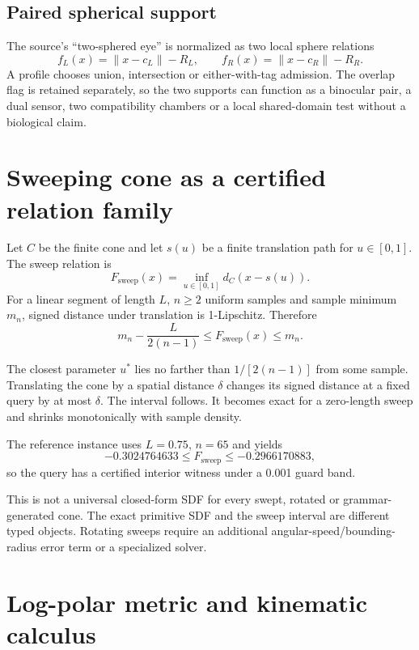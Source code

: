 \documentclass[10pt,a4paper]{article}
\begin{document}
\subsection{Paired spherical support}
The source's ``two-sphered eye'' is normalized as two local sphere relations
\[
f_L(x)=\|x-c_L\|-R_L,\qquad f_R(x)=\|x-c_R\|-R_R.
\]
A profile chooses union, intersection or either-with-tag admission. The overlap flag is retained separately, so the two supports can function as a binocular pair, a dual sensor, two compatibility chambers or a local shared-domain test without a biological claim.

\section{Sweeping cone as a certified relation family}

Let $C$ be the finite cone and let $s(u)$ be a finite translation path for $u\in[0,1]$. The sweep relation is
\[
F_{\mathrm{sweep}}(x)=\inf_{u\in[0,1]} d_C(x-s(u)).
\]
For a linear segment of length $L$, $n\ge2$ uniform samples and sample minimum $m_n$, signed distance under translation is 1-Lipschitz. Therefore
\[
m_n-\frac{L}{2(n-1)}\le F_{\mathrm{sweep}}(x)\le m_n.
\]

\begin{proofbox}
The closest parameter $u^*$ lies no farther than $1/[2(n-1)]$ from some sample. Translating the cone by a spatial distance $\delta$ changes its signed distance at a fixed query by at most $\delta$. The interval follows. It becomes exact for a zero-length sweep and shrinks monotonically with sample density.
\end{proofbox}

The reference instance uses $L=0.75$, $n=65$ and yields
\[
-0.3024764633\le F_{\mathrm{sweep}}\le-0.2966170883,
\]
so the query has a certified interior witness under a 0.001 guard band.

\begin{boundbox}
This is not a universal closed-form SDF for every swept, rotated or grammar-generated cone. The exact primitive SDF and the sweep interval are different typed objects. Rotating sweeps require an additional angular-speed/bounding-radius error term or a specialized solver.
\end{boundbox}

\section{Log-polar metric and kinematic calculus}
\end{document}
